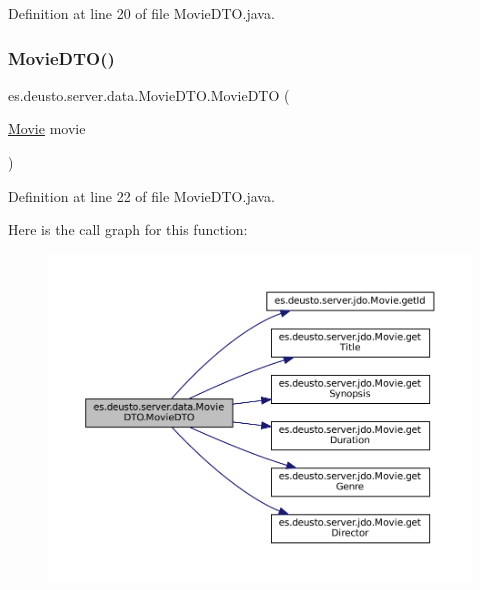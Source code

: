 Definition at line 20 of file Movie\+D\+T\+O.\+java.

\mbox{\label{classes_1_1deusto_1_1server_1_1data_1_1_movie_d_t_o_ad09b9cd627c8906f7ab7fe86d09b9e75}} 
\subsubsection{\texorpdfstring{MovieDTO()}{MovieDTO()}\hspace{0.1cm}{\footnotesize\ttfamily [2/2]}}
{\footnotesize\ttfamily es.\+deusto.\+server.\+data.\+Movie\+D\+T\+O.\+Movie\+D\+TO (\begin{DoxyParamCaption}\item[{\mbox{\hyperlink{classes_1_1deusto_1_1server_1_1jdo_1_1_movie}{Movie}}}]{movie }\end{DoxyParamCaption})}



Definition at line 22 of file Movie\+D\+T\+O.\+java.

Here is the call graph for this function\+:
\nopagebreak
\begin{figure}[H]
\begin{center}
\leavevmode
\includegraphics[width=350pt]{classes_1_1deusto_1_1server_1_1data_1_1_movie_d_t_o_ad09b9cd627c8906f7ab7fe86d09b9e75_cgraph}
\end{center}
\end{figure}


